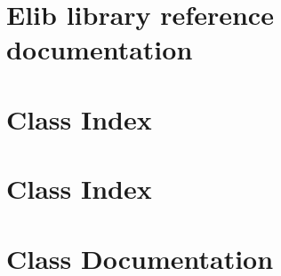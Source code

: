 \chapter{Elib library reference documentation} \label{app:elibref}
\chapter*{Class Index}

\chapter*{Class Index}

\chapter*{Class Documentation}










